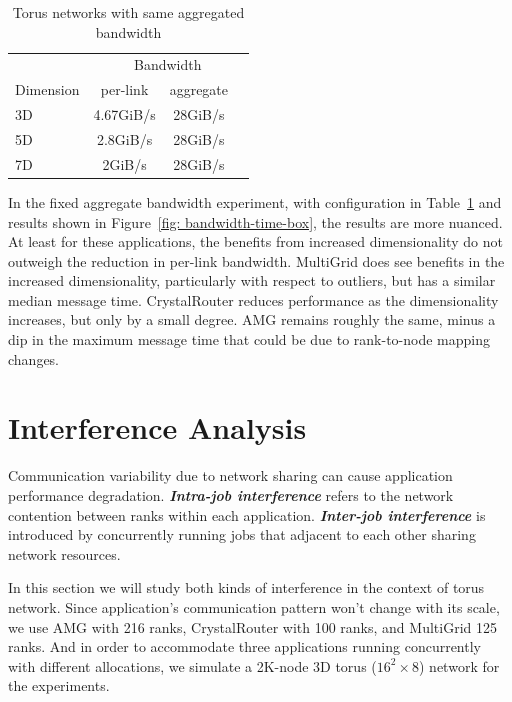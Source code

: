 \documentclass[conference]{IEEEtran}
\begin{document}
\begin{table}[ht]
\begin{center}
\caption{Torus networks with same aggregated bandwidth} 
\label{tab: fix-bandwidth}
\begin{tabular}{l c c c} 
\toprule %
\toprule
&\multicolumn{3}{c}{Bandwidth } \\
\cmidrule(l){2-4}
Dimension  & per-link & aggregate &\\ %
\midrule %
3D      & 4.67GiB/s  & 28GiB/s  & \\  %
\midrule %
5D    & 2.8GiB/s  & 28GiB/s  &\\ %
\midrule %
7D    & 2GiB/s & 28GiB/s & \\
\midrule
\bottomrule %
\end{tabular}
\end{center}
\end{table}

In the fixed aggregate bandwidth experiment, with configuration in Table~\ref{tab: fix-bandwidth} and results shown in Figure~\ref{fig: bandwidth-time-box}, the results are more nuanced. At least for these applications, the benefits from increased dimensionality do not outweigh the reduction in per-link bandwidth. MultiGrid does see benefits in the increased dimensionality, particularly with respect to outliers, but has a similar median message time. CrystalRouter reduces performance as the dimensionality increases, but only by a small degree. AMG remains roughly the same, minus a dip in the maximum message time that could be due to rank-to-node mapping changes.


\section{Interference Analysis}
\label{sec:interference}

Communication variability due to network sharing can cause application performance degradation. \textbf{\emph{Intra-job interference}} refers to the network contention between ranks within each application. \textbf{\emph{Inter-job interference}} is introduced by concurrently running jobs that adjacent to each other sharing network resources. 

In this section we will study both kinds of interference in the context of torus network. 
Since application's communication pattern won't change with its scale, we use AMG with 216 ranks, CrystalRouter with 100 ranks, and MultiGrid 125 ranks. And in order to accommodate three applications running concurrently with different allocations, we simulate a 2K-node 3D torus ($16^{2} \times 8$) network for the experiments.
\end{document}

